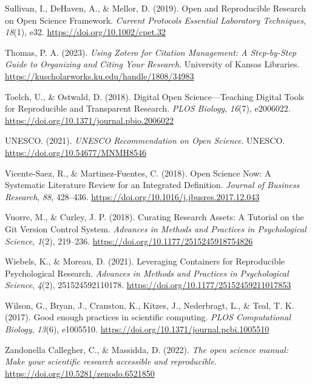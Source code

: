 \documentclass[
  a4paper,
]{article}
\newlength{\cslhangindent}
\newenvironment{CSLReferences}[2] %
 {\begin{list}{}{%
  \setlength{\itemindent}{0pt}
  \setlength{\leftmargin}{0pt}
  \setlength{\parsep}{0pt}
  \ifodd #1
   \setlength{\leftmargin}{\cslhangindent}
   \setlength{\itemindent}{-1\cslhangindent}
  \fi
  \setlength{\itemsep}{#2\baselineskip}}}
 {\end{list}}
\begin{document}
\begin{CSLReferences}{1}{0}
Sullivan, I., DeHaven, A., \& Mellor, D. (2019). Open and Reproducible
Research on Open Science Framework. \emph{Current Protocols Essential
Laboratory Techniques}, \emph{18}(1), e32.
\url{https://doi.org/10.1002/cpet.32}

Thomas, P. A. (2023). \emph{Using Zotero for Citation Management: A
Step-by-Step Guide to Organizing and Citing Your Research}. University
of Kansas Libraries.
\url{https://kuscholarworks.ku.edu/handle/1808/34983}

Toelch, U., \& Ostwald, D. (2018). Digital Open Science---{Teaching}
Digital Tools for Reproducible and Transparent Research. \emph{PLOS
Biology}, \emph{16}(7), e2006022.
\url{https://doi.org/10.1371/journal.pbio.2006022}

UNESCO. (2021). \emph{{UNESCO Recommendation} on {Open Science}}.
UNESCO. \url{https://doi.org/10.54677/MNMH8546}

Vicente-Saez, R., \& Martinez-Fuentes, C. (2018). Open {Science} Now:
{A} Systematic Literature Review for an Integrated Definition.
\emph{Journal of Business Research}, \emph{88}, 428--436.
\url{https://doi.org/10.1016/j.jbusres.2017.12.043}

Vuorre, M., \& Curley, J. P. (2018). Curating {Research Assets}: {A
Tutorial} on the {Git Version Control System}. \emph{Advances in Methods
and Practices in Psychological Science}, \emph{1}(2), 219--236.
\url{https://doi.org/10.1177/2515245918754826}

Wiebels, K., \& Moreau, D. (2021). Leveraging {Containers} for
{Reproducible Psychological Research}. \emph{Advances in Methods and
Practices in Psychological Science}, \emph{4}(2), 251524592110178.
\url{https://doi.org/10.1177/25152459211017853}

Wilson, G., Bryan, J., Cranston, K., Kitzes, J., Nederbragt, L., \&
Teal, T. K. (2017). Good enough practices in scientific computing.
\emph{PLOS Computational Biology}, \emph{13}(6), e1005510.
\url{https://doi.org/10.1371/journal.pcbi.1005510}

Zandonella Callegher, C., \& Massidda, D. (2022). \emph{The open science
manual: Make your scientific research accessible and reproducible}.
\url{https://doi.org/10.5281/zenodo.6521850}

\end{CSLReferences}
\end{document}

